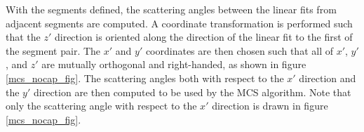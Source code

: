 \documentclass[a4paper,11pt]{article}
\begin{document}
With the segments defined, the scattering angles between the linear fits from adjacent segments are computed. A coordinate transformation is performed such that the $z'$ direction is oriented along the direction of the linear fit to the first of the segment pair. The $x'$ and $y'$ coordinates are then chosen such that all of $x'$, $y'$, and $z'$ are mutually orthogonal and right-handed, as shown in figure \ref{mcs_nocap_fig}. The scattering angles both with respect to the $x'$ direction and the $y'$ direction are then computed to be used by the MCS algorithm. Note that only the scattering angle with respect to the $x'$ direction is drawn in figure \ref{mcs_nocap_fig}.



\end{document}
